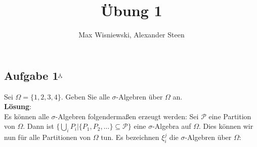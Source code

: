 \documentclass[11pt,a4paper,ngerman]{article}
\date{}
\title{Übung 1}
\author{Max Wisniewski, Alexander Steen}
\newcommand{\set}[1]{ \{ #1 \}}
\begin{document}

\renewcommand{\figurename}{Figure}

\maketitle
\thispagestyle{fancy}


\subsection*{Aufgabe 1$^\curlywedgedownarrow$}
Sei $\Omega = \{1,2,3,4\}$. Geben Sie alle $\sigma$-Algebren über $\Omega$ an. \\

\textbf{Lösung}: \\
Es können alle $\sigma$-Algebren folgendermaßen erzeugt werden: Sei $\mathcal{P}$ eine Partition von $\Omega$. Dann ist $\set{\bigcup_i P_i|\set{P_1,P_2,\ldots} \subseteq \mathcal{P}}$ eine $\sigma$-Algebra auf $\Omega$. Dies können wir nun für alle Partitionen von $\Omega$ tun. Es bezeichnen $\xi^j_i$ die $\sigma$-Algebren über $\Omega$: \\
\end{document}
